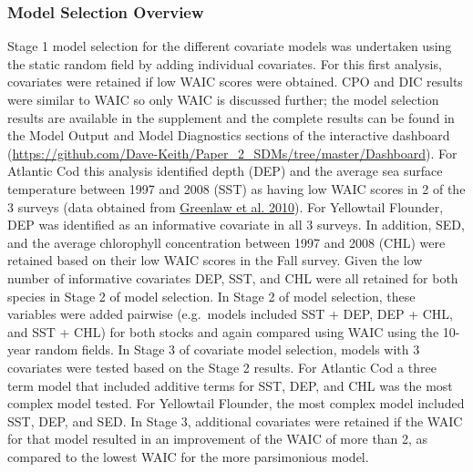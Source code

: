\documentclass[
]{article}
\begin{document}
\hypertarget{model-selection-overview}{%
\subsubsection{Model Selection Overview}\label{model-selection-overview}}

Stage 1 model selection for the different covariate models was undertaken using the static random field by adding individual covariates. For this first analysis, covariates were retained if low WAIC scores were obtained. CPO and DIC results were similar to WAIC so only WAIC is discussed further; the model selection results are available in the supplement and the complete results can be found in the Model Output and Model Diagnostics sections of the interactive dashboard (\url{https://github.com/Dave-Keith/Paper_2_SDMs/tree/master/Dashboard}). For Atlantic Cod this analysis identified depth (DEP) and the average sea surface temperature between 1997 and 2008 (SST) as having low WAIC scores in 2 of the 3 surveys (data obtained from \protect\hyperlink{ref-greenlawGeodatabaseHistoricalContemporary2010}{Greenlaw et al. 2010}). For Yellowtail Flounder, DEP was identified as an informative covariate in all 3 surveys. In addition, SED, and the average chlorophyll concentration between 1997 and 2008 (CHL) were retained based on their low WAIC scores in the Fall survey. Given the low number of informative covariates DEP, SST, and CHL were all retained for both species in Stage 2 of model selection. In Stage 2 of model selection, these variables were added pairwise (e.g.~models included SST + DEP, DEP + CHL, and SST + CHL) for both stocks and again compared using WAIC using the 10-year random fields. In Stage 3 of covariate model selection, models with 3 covariates were tested based on the Stage 2 results. For Atlantic Cod a three term model that included additive terms for SST, DEP, and CHL was the most complex model tested. For Yellowtail Flounder, the most complex model included SST, DEP, and SED. In Stage 3, additional covariates were retained if the WAIC for that model resulted in an improvement of the WAIC of more than 2, as compared to the lowest WAIC for the more parsimonious model.
\end{document}
